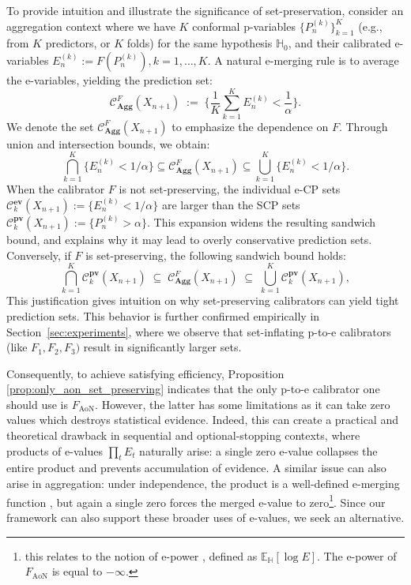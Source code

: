\documentclass{article}
\theoremstyle{plain}
\theoremstyle{definition}
\theoremstyle{remark}
\begin{document}
To provide intuition and illustrate the significance of set-preservation, consider an aggregation context where we have $K$ conformal p-variables $\{P_n^{(k)}\}_{k=1}^K$ (e.g., from $K$ predictors, or $K$ folds) for the same hypothesis $\mathbb{H}_0$, and their calibrated e-variables $E_n^{(k)}:=F(P_n^{(k)}), k=1,\dots,K$.
A natural e-merging rule is to average the e-variables, yielding the prediction set:
\begin{equation}
    \label{agg_CP_set_F}
\mathcal{C}^{F}_{\mathbf{Agg}}(X_{n+1})
\;:=\;
\Big\{\frac{1}{K}\sum_{k=1}^K E_n^{(k)} < \frac{1}{\alpha} \Big\}.
\end{equation}
We denote the set $\mathcal{C}^{F}_{\mathbf{Agg}}(X_{n+1})$ to emphasize the dependence on $F$. Through union and intersection bounds, we obtain:
\[
\bigcap_{k=1}^K \{E_n^{(k)}<1/\alpha\}
\subseteq
\mathcal{C}^{F}_{\mathbf{Agg}}(X_{n+1})
\subseteq
\bigcup_{k=1}^K \{E_n^{(k)}<1/\alpha\}.
\]
When the calibrator $F$ is not set-preserving, the individual e-CP sets $\mathcal{C}_k^{\mathbf{ev}}(X_{n+1}):=\{E_n^{(k)} < 1/\alpha\}$ are larger than the SCP sets $\mathcal{C}_k^{\textbf{pv}}(X_{n+1}):=\{P_n^{(k)}>\alpha\}$. This expansion widens the resulting sandwich bound, and  explains why it may lead to overly conservative prediction sets. Conversely, if $F$ is set-preserving, the following sandwich bound holds:$$\bigcap_{k=1}^K \mathcal{C}_k^{\textbf{pv}}(X_{n+1})
\;\subseteq\;
\mathcal{C}^{F}_{\mathbf{Agg}}(X_{n+1})
\;\subseteq\;
\bigcup_{k=1}^K\mathcal{C}_k^{\textbf{pv}}(X_{n+1}),
$$
This justification gives intuition on why set-preserving calibrators can yield tight prediction sets. This behavior is further confirmed empirically in Section~\ref{sec:experiments}, where we observe that set-inflating p-to-e calibrators (like $F_1,F_2,F_3)$ result in significantly larger sets. %



Consequently, to achieve satisfying efficiency, Proposition \ref{prop:only_aon_set_preserving} indicates that the only p-to-e calibrator one should use is $F_{\mathrm{AoN}}$. However, the latter has some limitations as it can take zero values which destroys statistical evidence. Indeed, this can create a practical and theoretical drawback in sequential and optional-stopping contexts, where products of e-values $\prod_t E_t$ naturally arise: a single zero e-value collapses the entire product and prevents accumulation of evidence.
A similar issue can also arise in aggregation: under independence, the product is a well-defined e-merging function \citep{vovk2021values}, but again a single zero forces the merged e-value to zero\footnote{this  relates to the notion of e-power  \citep{evaluespoly}, defined as $\mathbb{E}_{\mathbb{H}}[\log E]$. The e-power of $F_{\mathrm{AoN}}$ is equal to $-\infty$. }. Since our framework can also support these broader uses of e-values, we seek an alternative.
\end{document}
